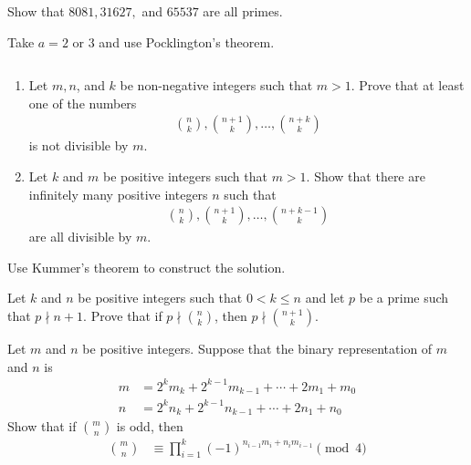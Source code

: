\documentclass{subfiles}
\begin{document}
	\begin{problem}
		Show that $8081, 31627,$ and $65537$ are all primes.
	\end{problem}
	\begin{hint}
		Take $a=2$ or $3$ and use Pocklington's theorem.
	\end{hint}

	\begin{problem}
		$ $
		\begin{enumerate}
			\item Let $m,n$, and $k$ be non-negative integers such that $m>1$. Prove that at least one of the numbers
				\begin{align*}
					\binom{n}{k}, \binom{n+1}{k}, \ldots,\binom{n+k}{k}
				\end{align*}
			 is not divisible by $m$.
			 \item Let $k$ and $m$ be positive integers such that $m>1$. Show that there are infinitely many positive integers $n$ such that
				 \begin{align*}
					 \binom{n}{k}, \binom{n+1}{k}, \ldots, \binom{n+k-1}{k}
				 \end{align*}
			 are all divisible by $m$.
		\end{enumerate}
	\end{problem}

	\begin{hint}
		Use Kummer's theorem to construct the solution.
	\end{hint}

	\begin{problem}
		Let $k$ and $n$ be positive integers such that $0<k\leq n$ and let $p$ be a prime such that $p \nmid n+1$. Prove that if $p\nmid\binom{n}{k}$, then $p \nmid\binom{n+1}{k}$.
	\end{problem}

	\begin{problem}
		Let $m$ and $n$ be positive integers. Suppose that the binary representation of $m$ and $n$ is
			\begin{align*}
				m   &= 2^km_k+2^{k-1}m_{k-1}+\cdots +2m_1+m_0\\
				n   &= 2^kn_k+2^{k-1}n_{k-1}+\cdots +2n_1+n_0
			\end{align*}
		Show that if $\binom{m}{n}$ is odd, then
			\begin{align*}
				\binom{m}{n}
					& \equiv \prod_{i=1}^{k} (-1)^{n_{i-1}m_i+n_im_{i-1}} \pmod 4
			\end{align*}
	\end{problem}
\end{document}
